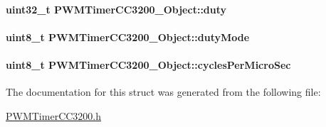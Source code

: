 \paragraph[{duty}]{\setlength{\rightskip}{0pt plus 5cm}uint32\+\_\+t P\+W\+M\+Timer\+C\+C3200\+\_\+\+Object\+::duty}\label{struct_p_w_m_timer_c_c3200___object_abcda935ccb7d1926e3044fe22c742ed7}
\paragraph[{duty\+Mode}]{\setlength{\rightskip}{0pt plus 5cm}uint8\+\_\+t P\+W\+M\+Timer\+C\+C3200\+\_\+\+Object\+::duty\+Mode}\label{struct_p_w_m_timer_c_c3200___object_af1f6cc3a1691db65a6dae41451f77789}
\paragraph[{cycles\+Per\+Micro\+Sec}]{\setlength{\rightskip}{0pt plus 5cm}uint8\+\_\+t P\+W\+M\+Timer\+C\+C3200\+\_\+\+Object\+::cycles\+Per\+Micro\+Sec}\label{struct_p_w_m_timer_c_c3200___object_adf7dc7746a99106f353aeb980b401a7d}


The documentation for this struct was generated from the following file\+:\begin{DoxyCompactItemize}
\item 
\hyperlink{_p_w_m_timer_c_c3200_8h}{P\+W\+M\+Timer\+C\+C3200.\+h}\end{DoxyCompactItemize}
